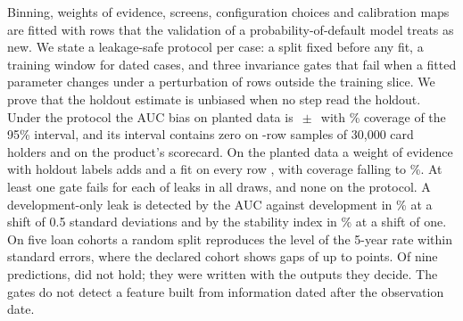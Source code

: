 Binning, weights of evidence, screens, configuration choices and calibration maps are fitted with rows that the validation of a probability-of-default model treats as new. We state a leakage-safe protocol per case: a split fixed before any fit, a training window for dated cases, and three invariance gates that fail when a fitted parameter changes under a perturbation of rows outside the training slice. We prove that the holdout estimate is unbiased when no step read the holdout. Under the protocol the AUC bias on planted data is $\,\pm\,$ with \% coverage of the 95\% interval, and its interval contains zero on -row samples of 30,000 card holders and on the product's scorecard. On the planted data a weight of evidence with holdout labels adds  and a fit on every row , with coverage falling to \%. At least one gate fails for each of  leaks in all  draws, and none on the protocol. A development-only leak is detected by the AUC against development in \% at a shift of 0.5 standard deviations and by the stability index in \% at a shift of one. On five loan cohorts a random split reproduces the level of the 5-year rate within  standard errors, where the declared cohort shows gaps of up to  points. Of nine predictions,  did not hold; they were written with the outputs they decide. The gates do not detect a feature built from information dated after the observation date.
